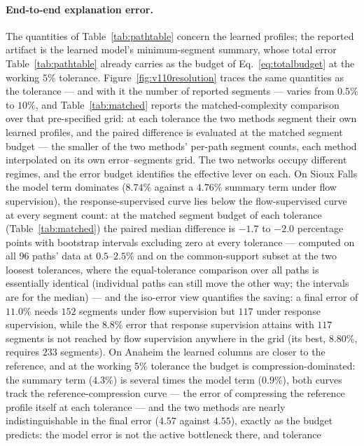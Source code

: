 \paragraph{End-to-end explanation error.}
The quantities of Table~\ref{tab:pathtable} concern the learned
profiles; the reported artifact is the learned model's minimum-segment
summary, whose total error Table~\ref{tab:pathtable} already carries as
the budget of Eq.~\eqref{eq:totalbudget} at the working $5\%$ tolerance.
Figure~\ref{fig:v110resolution} traces the same quantities as the
tolerance --- and with it the number of reported segments --- varies
from $0.5\%$ to $10\%$, and Table~\ref{tab:matched} reports the
matched-complexity comparison over that pre-specified grid: at each
tolerance the two methods segment their own learned profiles, and the
paired difference is evaluated at the matched segment budget --- the
smaller of the two methods' per-path segment counts, each method
interpolated on its own error--segments grid.
The two networks occupy different regimes, and the error budget
identifies the effective lever on each. On Sioux Falls the model term
dominates ($8.74\%$ against a $4.76\%$ summary term under flow
supervision), the response-supervised curve lies below the
flow-supervised curve at every segment count: at the matched segment
budget of each tolerance (Table~\ref{tab:matched}) the paired median
difference is $-1.7$ to $-2.0$ percentage points with bootstrap
intervals excluding zero at every tolerance --- computed on all 96
paths' data at $0.5$--$2.5\%$ and on the common-support subset at the
two loosest tolerances, where the equal-tolerance comparison over all
paths is essentially identical (individual paths can still move the
other way; the intervals are for the median) --- and the iso-error view
quantifies the
saving: a final error of $11.0\%$ needs $152$ segments under flow
supervision but $117$ under response supervision, while the $8.8\%$
error that response supervision attains with $117$ segments is not
reached by flow supervision anywhere in the grid (its best, $8.80\%$,
requires $233$ segments). On Anaheim the learned columns are closer to
the reference, and at the working $5\%$ tolerance the budget is
compression-dominated: the summary term ($4.3\%$) is several times the
model term ($0.9\%$), both curves track the reference-compression
curve --- the error of compressing the reference profile itself at each
tolerance --- and the two methods are nearly indistinguishable in the
final error ($4.57$ against $4.55$), exactly as the budget predicts:
the model error is not the active bottleneck there, and tolerance
